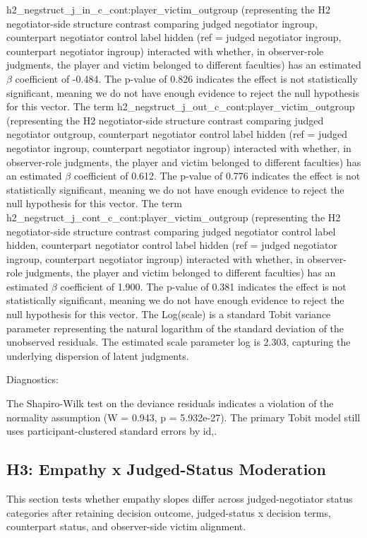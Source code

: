 \documentclass[11pt]{article}
\begin{document}
h2\_negstruct\_j\_in\_c\_cont:player\_victim\_outgroup (representing the H2 negotiator-side structure contrast comparing judged negotiator ingroup, counterpart negotiator control label hidden (ref = judged negotiator ingroup, counterpart negotiator ingroup) interacted with whether, in observer-role judgments, the player and victim belonged to different faculties) has an estimated $\beta$ coefficient of -0.484. The p-value of 0.826 indicates the effect is not statistically significant, meaning we do not have enough evidence to reject the null hypothesis for this vector. The term h2\_negstruct\_j\_out\_c\_cont:player\_victim\_outgroup (representing the H2 negotiator-side structure contrast comparing judged negotiator outgroup, counterpart negotiator control label hidden (ref = judged negotiator ingroup, counterpart negotiator ingroup) interacted with whether, in observer-role judgments, the player and victim belonged to different faculties) has an estimated $\beta$ coefficient of 0.612. The p-value of 0.776 indicates the effect is not statistically significant, meaning we do not have enough evidence to reject the null hypothesis for this vector. The term h2\_negstruct\_j\_cont\_c\_cont:player\_victim\_outgroup (representing the H2 negotiator-side structure contrast comparing judged negotiator control label hidden, counterpart negotiator control label hidden (ref = judged negotiator ingroup, counterpart negotiator ingroup) interacted with whether, in observer-role judgments, the player and victim belonged to different faculties) has an estimated $\beta$ coefficient of 1.900. The p-value of 0.381 indicates the effect is not statistically significant, meaning we do not have enough evidence to reject the null hypothesis for this vector. The Log(scale) is a standard Tobit variance parameter representing the natural logarithm of the standard deviation of the unobserved residuals. The estimated scale parameter log is 2.303, capturing the underlying dispersion of latent judgments.

Diagnostics:

The Shapiro-Wilk test on the deviance residuals indicates a violation of the normality assumption (W = 0.943, p = 5.932e-27). The primary Tobit model still uses participant-clustered standard errors by id,.



\subsection{H3: Empathy x Judged-Status Moderation}
This section tests whether empathy slopes differ across judged-negotiator status categories after retaining decision outcome, judged-status x decision terms, counterpart status, and observer-side victim alignment.
\end{document}
